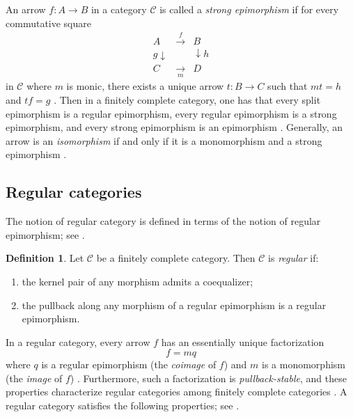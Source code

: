 \documentclass[12pt]{amsart}
\theoremstyle{definition}
\newtheorem{definition}[theorem]{Definition}
\begin{document}
An arrow $f:A\rightarrow B$ in a category $\mathcal{C}$ is called a \emph{%
strong epimorphism} if for every commutative square%
\begin{equation*}
\begin{array}{ccc}
A & \overset{f}{\rightarrow } & B \\ 
g\downarrow &  & \downarrow h \\ 
C & \underset{m}{\rightarrow } & D%
\end{array}%
\end{equation*}%
in $\mathcal{C}$ where $m$ is monic, there exists a unique arrow $%
t:B\rightarrow C$ such that $mt=h$ and $tf=g$ \cite[Definition~1.1]%
{gran_introduction_2021}. Then in a finitely complete category, one has that
every split epimorphism is a regular epimorphism, every regular epimorphism
is a strong epimorphism, and every strong epimorphism is an epimorphism \cite%
[Definition~1.1]{gran_introduction_2021}. Generally, an arrow is an \emph{%
isomorphism} if and only if it is a monomorphism and a strong epimorphism 
\cite[Lemma~1.3]{gran_introduction_2021}.

\subsection{Regular categories}

The notion of regular category is defined in terms of the notion of regular
epimorphism; see \cite[Definition~1.10]{gran_introduction_2021}.

\begin{definition}
Let $\mathcal{C}$ be a finitely complete category. Then $\mathcal{C}$ is 
\emph{regular} if:

\begin{enumerate}
\item the kernel pair of any morphism admits a coequalizer;

\item the pullback along any morphism of a regular epimorphism is a regular
epimorphism.
\end{enumerate}
\end{definition}

In a regular category, every arrow $f$ has an essentially unique
factorization%
\begin{equation*}
f=mq
\end{equation*}%
where $q$ is a regular epimorphism (the \emph{coimage} of $f$) and $m$ is a
monomorphism (the \emph{image} of $f$) \cite[Theorem~1.11]%
{gran_introduction_2021}. Furthermore, such a factorization is \emph{%
pullback-stable}, and these properties characterize regular categories among
finitely complete categories \cite[Theorem~1.14]{gran_introduction_2021}. A
regular category satisfies the following properties; see \cite[Proposition
1.13]{gran_introduction_2021}.
\end{document}
